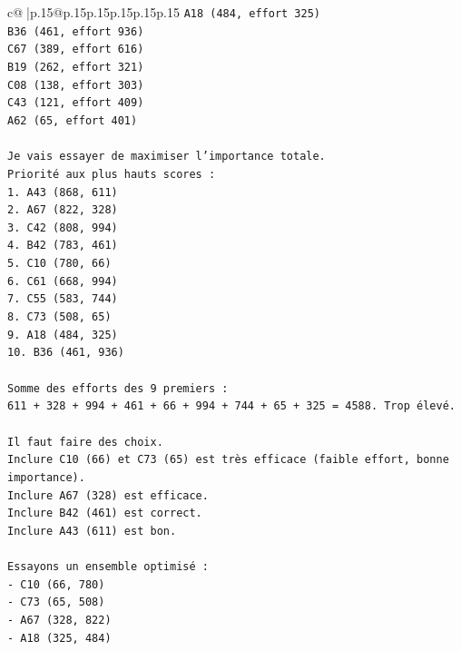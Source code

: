 \documentclass{article}
\begin{document}
{\begin{supertabular}{c@{$\;$}|p{.15\linewidth}@{}p{.15\linewidth}p{.15\linewidth}p{.15\linewidth}p{.15\linewidth}p{.15\linewidth}}
{{{\texttt{A18 (484, effort 325)} \\
\texttt{B36 (461, effort 936)} \\
\texttt{C67 (389, effort 616)} \\
\texttt{B19 (262, effort 321)} \\
\texttt{C08 (138, effort 303)} \\
\texttt{C43 (121, effort 409)} \\
\texttt{A62 (65, effort 401)} \\
\\ 
\texttt{Je vais essayer de maximiser l'importance totale.} \\
\texttt{Priorité aux plus hauts scores :} \\
\texttt{1. A43 (868, 611)} \\
\texttt{2. A67 (822, 328)} \\
\texttt{3. C42 (808, 994)} \\
\texttt{4. B42 (783, 461)} \\
\texttt{5. C10 (780, 66)} \\
\texttt{6. C61 (668, 994)} \\
\texttt{7. C55 (583, 744)} \\
\texttt{8. C73 (508, 65)} \\
\texttt{9. A18 (484, 325)} \\
\texttt{10. B36 (461, 936)} \\
\\ 
\texttt{Somme des efforts des 9 premiers :} \\
\texttt{611 + 328 + 994 + 461 + 66 + 994 + 744 + 65 + 325 = 4588. Trop élevé.} \\
\\ 
\texttt{Il faut faire des choix.} \\
\texttt{Inclure C10 (66) et C73 (65) est très efficace (faible effort, bonne importance).} \\
\texttt{Inclure A67 (328) est efficace.} \\
\texttt{Inclure B42 (461) est correct.} \\
\texttt{Inclure A43 (611) est bon.} \\
\\ 
\texttt{Essayons un ensemble optimisé :} \\
\texttt{{-} C10 (66, 780)} \\
\texttt{{-} C73 (65, 508)} \\
\texttt{{-} A67 (328, 822)} \\
\texttt{{-} A18 (325, 484)} \\
}}}
\end{supertabular}}
\end{document}
